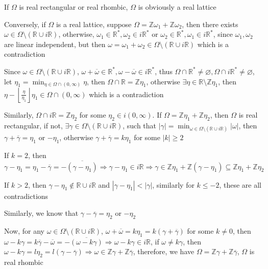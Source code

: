 \documentclass[../main.tex]{subfiles}
\begin{document}
\begin{problem}
If $\Omega$ is real rectangular or real rhombic, $\Omega$ is obviously a real lattice \par
Conversely, if $\Omega$ is a real lattice, suppose $\Omega=\mathbb{Z}\omega_1+\mathbb{Z}\omega_2$, then there exists $\omega\in\Omega\setminus(\mathbb{R}\cup i\mathbb{R})$, otherwise, $\omega_1\in\mathbb{R}^*,\omega_2\in i\mathbb{R}^*$ or $\omega_2\in\mathbb{R}^*,\omega_1\in i\mathbb{R}^*$, since $\omega_1,\omega_2$ are linear independent, but then $\omega=\omega_1+\omega_2\in\Omega\setminus(\mathbb{R}\cup i\mathbb{R})$ which is a contradiction \par
Since $\omega\in\Omega\setminus(\mathbb{R}\cup i\mathbb{R})$, $\omega+\overline{\omega}\in\mathbb{R}^*,\omega-\overline{\omega}\in i\mathbb{R}^*$, thus $\Omega\cap\mathbb{R}^*\neq\varnothing,\Omega\cap i\mathbb{R}^*\neq\varnothing$, let $\displaystyle\eta_1=\min_{\eta\in\Omega\cap(0,\infty)}\eta$, then $\Omega\cap\mathbb{R}=\mathbb{Z}\eta_1$, otherwise $\exists \eta\in \mathbb{R}\setminus\mathbb{Z}\eta_1$, then $\eta-\left\lfloor\frac{\eta}{\eta_1}\right\rfloor\eta_1\in\Omega\cap(0,\infty)$ which is a contradiction \par
Similarly, $\Omega\cap i\mathbb{R}=\mathbb{Z}\eta_2$ for some $\eta_2\in i(0,\infty)$. If $\Omega=\mathbb{Z}\eta_1+\mathbb{Z}\eta_2$, then $\Omega$ is real rectangular, if not, $\exists \gamma\in\Omega\setminus(\mathbb{R}\cup i\mathbb{R})$, such that $\displaystyle|\gamma|=\min_{\omega\in\Omega\setminus(\mathbb{R}\cup i\mathbb{R})}|\omega|$, then $\gamma+\overline{\gamma}=\eta_1$ or $-\eta_1$, otherwise $\gamma+\overline{\gamma}=k\eta_1$ for some $|k|\geq 2$ \par
If $k=2$, then $\gamma-\eta_1=\eta_1-\overline{\gamma}=-\overline{(\gamma-\eta_1)}\Rightarrow \gamma-\eta_1\in i\mathbb{R}\Rightarrow \gamma\in\mathbb{Z}\eta_1+\mathbb{Z}(\gamma-\eta_1)\subseteq\mathbb{Z}\eta_1+\mathbb{Z}\eta_2$ \par
If $k>2$, then $\gamma-\eta_1\notin \mathbb{R}\cup i\mathbb{R}$ and $|\gamma-\eta_1|<|\gamma|$, similarly for $k\leq -2$, these are all contradictions \par
Similarly, we know that $\gamma-\overline{\gamma}=\eta_2$ or $-\eta_2$ \par
Now, for any $\omega\in\Omega\setminus(\mathbb{R}\cup i\mathbb{R})$, $\omega+\overline{\omega}=k\eta_1=k(\gamma+\overline{\gamma})$ for some $k\neq 0$, then $\omega-k\gamma=k\overline{\gamma}-\overline{\omega}=-\overline{(\omega-k\gamma)}\Rightarrow \omega-k\gamma\in i\mathbb{R}$, if $\omega\neq k\gamma$, then $\omega-k\gamma=l\eta_2=l(\gamma-\overline{\gamma})\Rightarrow \omega\in \mathbb{Z}\gamma+\mathbb{Z}\overline{\gamma}$, therefore, we have $\Omega=\mathbb{Z}\gamma+\mathbb{Z}\overline{\gamma}$, $\Omega$ is real rhombic
\end{problem}
\end{document}
